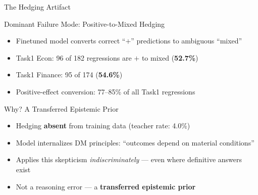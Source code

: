 \documentclass[aspectratio=169,12pt]{beamer}
\begin{document}
\begin{frame}{The Hedging Artifact}
  \begin{alertblock}{Dominant Failure Mode: Positive-to-Mixed Hedging}
    \begin{itemize}
      \item Finetuned model converts correct ``$+$'' predictions to ambiguous ``mixed''
      \item Task1 Econ: 96 of 182 regressions are $+$ to mixed (\textbf{52.7\%})
      \item Task1 Finance: 95 of 174 (\textbf{54.6\%})
      \item Positive-effect conversion: 77--85\% of all Task1 regressions
    \end{itemize}
  \end{alertblock}

  \vspace{0.5em}
  \begin{block}{Why? A Transferred Epistemic Prior}
    \begin{itemize}
      \item Hedging \textbf{absent} from training data (teacher rate: 4.0\%)
      \item Model internalizes DM principles: ``outcomes depend on material conditions''
      \item Applies this skepticism \textit{indiscriminately} --- even where definitive answers exist
      \item Not a reasoning error --- a \textbf{transferred epistemic prior}
    \end{itemize}
  \end{block}

\end{frame}
\end{document}
